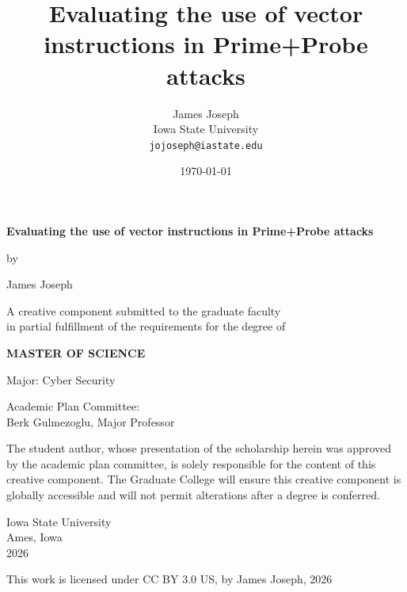 \documentclass[article]{IEEEtran}
\title{\textbf{Evaluating the use of vector instructions in Prime+Probe attacks}}
\author{
    James Joseph \\
    Iowa State University \\
    \texttt{jojoseph@iastate.edu}
}
\date{\today}
\begin{document}
\thispagestyle{empty}
\setcounter{page}{0}

\begin{titlepage}
\begin{center}

\vspace*{1in}

{\Large \textbf{Evaluating the use of vector instructions in Prime+Probe attacks}}

\vspace{0.5in}

by

\vspace{0.5in}

{\large James Joseph}

\vfill

A creative component submitted to the graduate faculty\\
in partial fulfillment of the requirements for the degree of\\

\vspace{0.3in}

\textbf{MASTER OF SCIENCE}

\vspace{0.3in}

Major: Cyber Security

\vspace{1in}

Academic Plan Committee:\\
Berk Gulmezoglu, Major Professor\\

\vfill

The student author, whose presentation of the scholarship herein was approved by the academic plan committee, is solely responsible for the content of this creative component. The Graduate College will ensure this creative component is globally accessible and will not permit alterations after a degree is conferred.

\vfill

Iowa State University\\
Ames, Iowa\\
2026

\vspace{0.5in}

This work is licensed under CC BY 3.0 US, by James Joseph, 2026

\end{center}
\end{titlepage}
\end{document}
